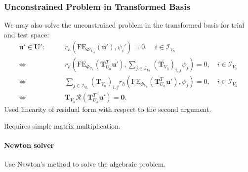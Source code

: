 \begin{frame}
\frametitle<presentation>{Unconstrained Problem in Transformed Basis}
We may also solve the unconstrained problem
in the transformed basis for trial and test space:
\begin{equation}\label{Eq:TransformedUnconstrainedProblem}
\begin{split}
\mathbf{u}'\in\mathbf{U}' : \qquad
& r_h\left(\text{FE}_{\Phi'_{U_h}}(\mathbf{u}'),\psi_i'\right) = 0, \quad
i\in\mathcal{I}_{V_h}\\
\Leftrightarrow \  &
r_h\left(\text{FE}_{\Phi_{U_h}}(\mathbf{T}^T_{U_h}\mathbf{u}'),
\sum_{j\in\mathcal{I}_{V_h}}\left(\mathbf{T}_{V_h}\right)_{i,j}\psi_j\right) = 0, \quad
i\in\mathcal{I}_{V_h}\\
\Leftrightarrow \  &
\sum_{j\in\mathcal{I}_{V_h}} \left(\mathbf{T}_{V_h}\right)_{i,j}
r_h\left(\text{FE}_{\Phi_{U_h}}(\mathbf{T}^T_{U_h}\mathbf{u}'),
\psi_j\right) = 0, \quad
i\in\mathcal{I}_{V_h}\\
\Leftrightarrow \  &
\mathbf{T}_{V_h} \mathcal{R}\left(\mathbf{T}^T_{U_h}\mathbf{u}'\right)
= \mathbf{0} .
\end{split}
\end{equation}
Used linearity of residual form with respect to the second argument.

Requires simple matrix multiplication.
\end{frame}

\paragraph{Newton solver}

Use Newton's method to solve the algebraic problem.

